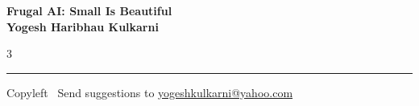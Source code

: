 \documentclass[8pt,landscape]{article}
\begin{document}
\footnotesize

\begin{center}
\Large{\textbf{Frugal AI: Small Is Beautiful\\ Yogesh Haribhau Kulkarni}}
\end{center}

\begin{multicols}{3}

\end{multicols}

\rule{\linewidth}{0.25pt}
\scriptsize
Copyleft \textcopyleft\  Send suggestions to
\href{http://www.yogeshkulkarni.com}{yogeshkulkarni@yahoo.com}
\end{document}
